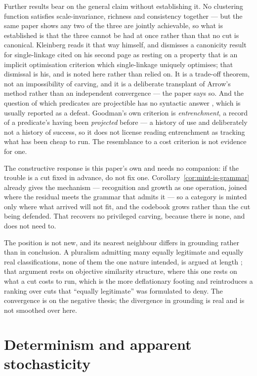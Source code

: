 \documentclass[11pt,a4paper]{article}
\theoremstyle{remark}\newtheorem{remark}[definition]{Remark}
\begin{document}
Further results bear on the general claim without establishing it. No clustering function
satisfies scale-invariance, richness and consistency together \citep{kleinberg2002} --- but the same
paper shows any two of the three are jointly achievable, so what is established is that the three
cannot be had at once rather than that no cut is canonical. Kleinberg reads it that way himself, and
dismisses a canonicity result for single-linkage cited on his second page as resting on a property
that is an implicit optimisation criterion which single-linkage uniquely optimises; that dismissal is
his, and is noted here rather than relied on. It is a trade-off theorem, not an impossibility of
carving, and it is a deliberate
transplant of Arrow's method rather than an independent convergence --- the paper says so. And the
question of which predicates are projectible has no syntactic answer \citep{goodman1955}, which is
usually reported as a defeat. Goodman's own criterion is \emph{entrenchment}, a record of a
predicate's having been \emph{projected} before --- a history of use and deliberately not a history
of success, so it does not license reading entrenchment as tracking what has been cheap to run. The resemblance to a cost criterion is not evidence for one.

The constructive response is this paper's own and needs no companion: if the trouble is a cut fixed in
advance, do not fix one. Corollary~\ref{cor:mint-is-grammar} already gives the mechanism --- recognition
and growth as one operation, joined where the residual meets the grammar that admits it --- so a
category is minted only where what arrived will not fit, and the codebook grows rather than the cut
being defended. That recovers no privileged carving, because there is none, and does not need to.

The position is not new, and its nearest neighbour differs in grounding rather than in conclusion. A
pluralism admitting many equally legitimate and equally real classifications, none of them the one
nature intended, is argued at length \citep{dupre1993}; that argument rests on objective similarity
structure, where this one rests on what a cut costs to run, which is the more deflationary footing and
reintroduces a ranking over cuts that ``equally legitimate'' was formulated to deny. The convergence
is on the negative thesis; the divergence in grounding is real and is not smoothed over here.

\section{Determinism and apparent stochasticity}\label{sec:determinism}
\end{document}
